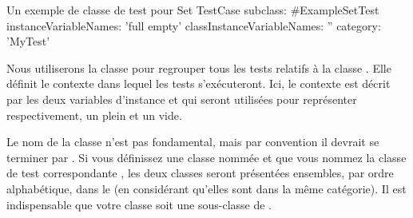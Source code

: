 \documentclass[a4paper,10pt,twoside]{book}
\begin{document}
\newpage{}
\begin{classdef}[exampleSetTest]{Un exemple de classe de test pour Set}
TestCase subclass: #ExampleSetTest
	instanceVariableNames: 'full empty'
	classInstanceVariableNames: ''
	category: 'MyTest'
\end{classdef}
% 

Nous utiliserons la classe  pour regrouper tous les tests relatifs
à la classe . Elle définit le contexte dans lequel les tests s'exécuteront. Ici, le contexte est décrit par les deux variables d'instance  et  qui seront utilisées pour représenter respectivement, un  plein et un  vide.

Le nom de la classe n'est pas fondamental, mais par convention il devrait se terminer par .
Si vous définissez une classe nommée  et que vous nommez la classe de test correspondante , les deux classes seront présentées ensembles, par ordre alphabétique, dans le  (en considérant qu'elles sont dans la même catégorie). Il est indispensable que votre classe soit une sous-classe de .

\end{document}
